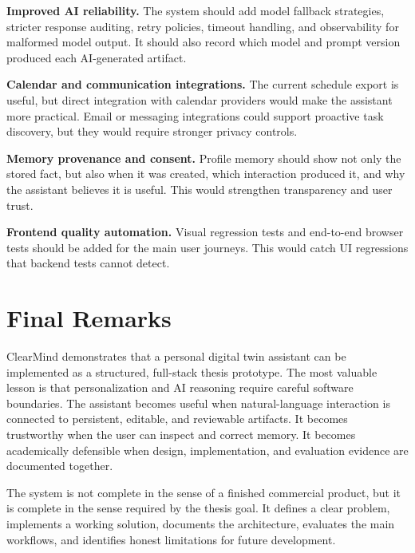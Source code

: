 \textbf{Improved AI reliability.} The system should add model fallback strategies, stricter response auditing, retry policies, timeout handling, and observability for malformed model output. It should also record which model and prompt version produced each AI-generated artifact.

\textbf{Calendar and communication integrations.} The current schedule export is useful, but direct integration with calendar providers would make the assistant more practical. Email or messaging integrations could support proactive task discovery, but they would require stronger privacy controls.

\textbf{Memory provenance and consent.} Profile memory should show not only the stored fact, but also when it was created, which interaction produced it, and why the assistant believes it is useful. This would strengthen transparency and user trust.

\textbf{Frontend quality automation.} Visual regression tests and end-to-end browser tests should be added for the main user journeys. This would catch UI regressions that backend tests cannot detect.

\section{Final Remarks}

ClearMind demonstrates that a personal digital twin assistant can be implemented as a structured, full-stack thesis prototype. The most valuable lesson is that personalization and AI reasoning require careful software boundaries. The assistant becomes useful when natural-language interaction is connected to persistent, editable, and reviewable artifacts. It becomes trustworthy when the user can inspect and correct memory. It becomes academically defensible when design, implementation, and evaluation evidence are documented together.

The system is not complete in the sense of a finished commercial product, but it is complete in the sense required by the thesis goal. It defines a clear problem, implements a working solution, documents the architecture, evaluates the main workflows, and identifies honest limitations for future development.
